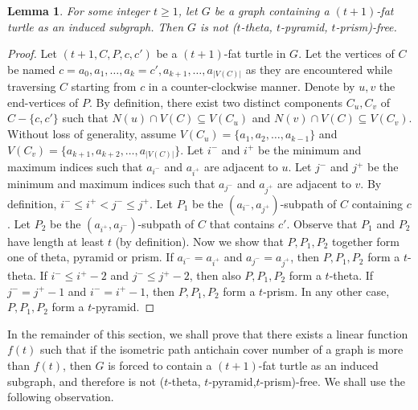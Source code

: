 \documentclass[a4paper]{article}
\newtheorem{lemma}[theorem]{Lemma}
\newtheorem{definition}[theorem]{Definition}
\begin{document}
\begin{lemma}\label{lem:fat-turtle}
For some integer $t\geq 1$, let $G$ be a graph containing a $(t+1)$-fat turtle as an induced subgraph. Then $G$ is not ($t$-theta, $t$-pyramid, $t$-prism)-free.  
\end{lemma}
 \begin{proof}
 Let $(t+1,C,P,c,c')$ be a $(t+1)$-fat turtle in $G$. Let the vertices of $C$ be named $c=a_0, a_1, \ldots, a_k=c', a_{k+1},\ldots, a_{|V(C)|}$ as they are encountered while traversing $C$ starting from $c$ in a counter-clockwise manner. Denote by
 $u,v$ the end-vertices of $P$. By definition, there exist two distinct components $C_u,C_v$ of $C-\{c,c'\}$ such that $N(u) \cap V(C) \subseteq V(C_u)$ and $N(v) \cap V(C) \subseteq V(C_v)$. Without loss of generality, assume $V(C_u) = \{a_1, a_2, \ldots, a_{k-1}\}$ and $V(C_v) = \{a_{k+1}, a_{k+2}, \ldots, a_{|V(C)|}\}$. Let $i^-$ and $i^+$ be the minimum and maximum indices such that $a_{i^-}$ and $a_{i^+}$ are adjacent to $u$. Let $j^-$ and $j^+$ be the minimum and maximum indices such that $a_{j^-}$ and $a_{j^+}$ are adjacent to $v$. By definition, $i^-\leq i^+ < j^-\leq j^+$. Let $P_1$ be the $(a_{i^-},a_{j^+})$-subpath of $C$ containing $c$. Let $P_2$ be the $(a_{i^+},a_{j^-})$-subpath of $C$ that contains $c'$. Observe that $P_1$ and $P_2$ have length at least $t$ (by definition). Now we show that $P,P_1,P_2$ together form one of theta, pyramid or prism. If $a_{i^-} = a_{i^+}$ and $a_{j^-} = a_{j^+}$, then $P,P_1,P_2$ form a $t$-theta. If $i^-\leq i^+-2$ and $j^-\leq j^+-2$, then also $P,P_1,P_2$ form a $t$-theta. If $j^-= j^+-1$ and $i^-= i^+-1$, then $P,P_1,P_2$ form a $t$-prism. In any other case, $P,P_1,P_2$ form a $t$-pyramid.
 \end{proof}



In the remainder of this section, we shall prove that there exists a linear function $f(t)$ such that if the isometric path antichain cover number of a graph is more than $f(t)$, then $G$ is forced to contain a $(t+1)$-fat turtle as an induced subgraph, and therefore is not ($t$-theta, $t$-pyramid,$t$-prism)-free. We shall use the following observation.


\end{document}
